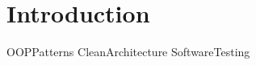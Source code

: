 \section{Introduction}

{OOPPatterns}
{CleanArchitecture}
{SoftwareTesting}

\nocite{imt_software_wiki}  %